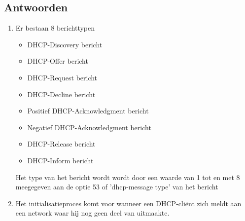 \documentclass{report}
\begin{document}
\subsection{Antwoorden}
\begin{enumerate}
\item {Er bestaan 8 berichttypen
\begin{itemize}
\item DHCP-Discovery bericht
\item DHCP-Offer bericht
\item DHCP-Request bericht
\item DHCP-Decline bericht
\item Positief DHCP-Acknowledgment bericht
\item Negatief DHCP-Acknowledgment bericht
\item DHCP-Release bericht
\item DHCP-Inform bericht
\end{itemize}
Het type van het bericht wordt wordt door een waarde van 1 tot en met 8 meegegeven aan de optie 53 of 'dhcp-message type' van het bericht}
\item {Het initialisatieproces komt voor wanneer een DHCP-cliënt zich meldt aan een network waar hij nog geen deel van uitmaakte.
	
}
\end{enumerate}
\end{document}
